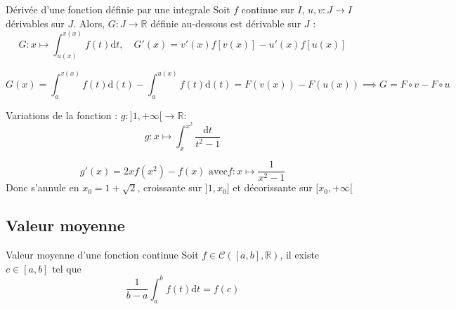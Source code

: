 \begin{Theorem}{Dérivée d'une fonction définie par une integrale}{}
Soit $f$ continue sur $I$, $u, v : J \to I$ dérivables sur $J$. Alors, $G : J \to \mathbb{R}$ définie au-dessous est dérivable sur $J$ :
\begin{equation}
  G : x \mapsto \int_{u(x)}^{v(x)} f(t) \mathrm{d} t, \quad G'(x) = v'(x) f[v(x)] - u'(x) f[u(x)]
\end{equation}



\end{Theorem}

\begin{myproof}{}{}
\begin{equation}
  G(x) = \int_{a}^{v(x)} f(t) \mathrm{d}(t) - \int_{a}^{u(x)} f(t) \mathrm{d}(t) = F(v(x)) - F(u(x)) \implies G = F \circ v - F \circ u
\end{equation}
\end{myproof}

\begin{Example}{}{}
  Variations de la fonction : $g : ]1, + \infty[ \to \mathbb{R}$:
\begin{equation}
  g : x \mapsto \int_{x}^{x ^{2}} \frac{\mathrm{d}t}{t ^{2}-1} 
\end{equation}
\end{Example}

\begin{myproof}{}{}
\begin{equation}
  g'(x) = 2x f(x ^{2}) - f(x) \text{ avec} f : x \mapsto \frac{1}{x ^{2} - 1} 
\end{equation}
Donc s'annule en $x_0 = 1 + \sqrt{2}$, croissante sur $]1, x_0]$ et décorissante sur $[x_0, + \infty[$
\end{myproof}

\subsection{Valeur moyenne} %
\label{sub:Valeur moyenne}

\begin{Theorem}{Valeur moyenne d'une fonction continue}{}
  Soit $f \in \mathcal{C}([a,b], \mathbb{R})$, il existe $c \in [a,b]$ tel que 
  \begin{equation}
    \frac{1}{b-a}  \int_{a}^{b} f(t) \mathrm{d}t = f(c)
  \end{equation}
\end{Theorem}


